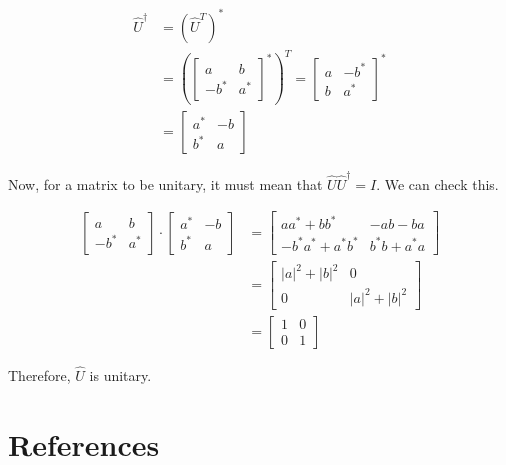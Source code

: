 \documentclass[12pt,a4paper]{article}
\begin{document}
		\begin{align*}
			\hat{U}^{\dagger} &= (\hat{U}^T)^* \\
			&= \left(\begin{bmatrix} a & b \\ -b^* & a^* \end{bmatrix}^*\right)^T = \begin{bmatrix} a & -b^* \\ b & a^* \end{bmatrix}^* \\
			&= \begin{bmatrix} a^* & -b \\ b^* & a \end{bmatrix}
		\end{align*}

		Now, for a matrix to be unitary, it must mean that $\hat{U}\hat{U}^{\dagger} = I$. We can check this.

		\begin{align*}
			\begin{bmatrix} a & b \\ -b^* & a^* \end{bmatrix}\cdot\begin{bmatrix} a^* & -b \\ b^* & a \end{bmatrix} &= \begin{bmatrix} aa^* + bb^* & -ab - ba \\ -b^*a^* + a^*b^* & b^*b + a^*a \end{bmatrix} \\
			&= \begin{bmatrix} |a|^2 + |b|^2 & 0 \\ 0 & |a|^2 + |b|^2 \end{bmatrix} \\
			&= \begin{bmatrix} 1 & 0 \\ 0 & 1 \end{bmatrix}
		\end{align*}

		Therefore, $\hat{U}$ is unitary.
	
	\newpage
	\section{References}
		\printbibliography[heading=none]
\end{document}
